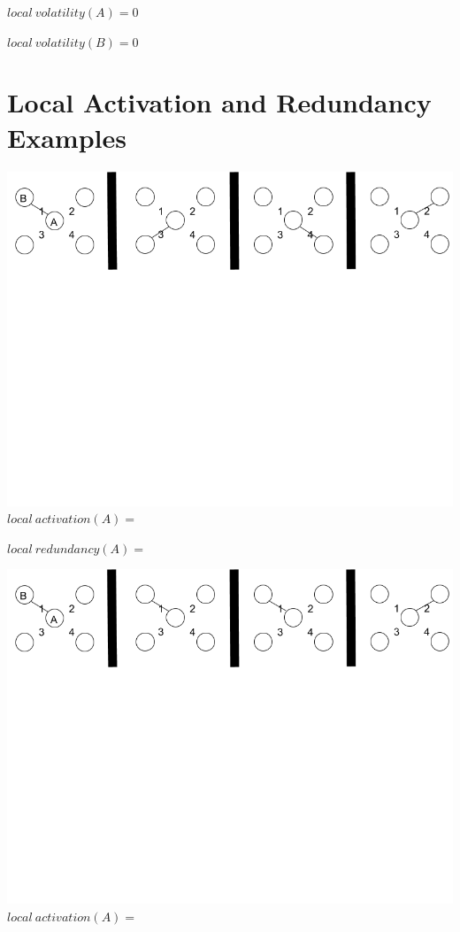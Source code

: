 \documentclass[oneside,12pt]{Classes/RoboticsLaTeX}
\begin{document}
\begin{appendices}
\begin{center}
$local\ volatility(A) = 0$

$local\ volatility(B) = 0$
\end{center}

\chapter{Local Activation and Redundancy Examples}
\begin{center}
\includegraphics[trim={0 15cm 0 0}, width=140mm]{./Figures/volatilityAppendix1.png}
$local\ activation(A) =$

$local\ redundancy(A) =$

\end{center}
\begin{center}
\includegraphics[trim={0 15cm 0 0}, width=140mm]{./Figures/volatilityAppendix2.png}
$local\ activation(A) =$


\end{center}
\end{appendices}
\end{document}
